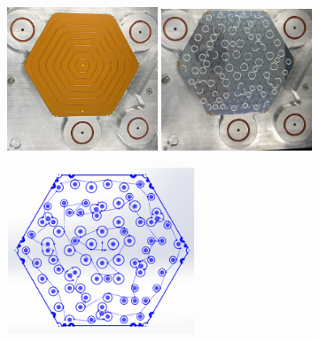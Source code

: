 \begin{figure}[!htbp]
    \centering
    \includegraphics[width=0.4\textwidth]{figures/chapter05/Dispensing_first.jpeg}
    \includegraphics[width=0.4\textwidth]{figures/chapter05/Dispensing_second.jpeg}
    \label{fig:c05f07}
\end{figure}

\begin{figure}[!htbp]
    \centering
    \includegraphics[width=0.5\textwidth]{figures/chapter05/Dispensing_2nd_path.png}
    \label{fig:c05f08}
\end{figure}

